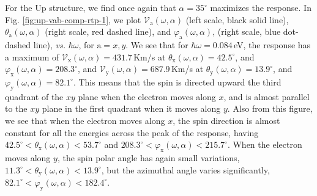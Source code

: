 \documentclass[floatfix,prb,aps,superscriptaddress,showpacs,11pt,preprint,letterpaper]{revtex4}
\begin{document}
For the Up structure, we find once again that  $\alpha=35^{\circ}$ maximizes
the response. In Fig. \ref{fig:up-vab-comp-rtp-1}, we plot
$\mathcal{V}_{\mathrm{a}} (\omega,\alpha)$ (left scale, black solid line),
$\theta_{\mathrm{a}} (\omega,\alpha)$ (right scale, red dashed  line), and
$\varphi_{\mathrm{a}} (\omega,\alpha)$, (right scale, blue dot-dashed  line), {\it vs.}
$\hbar\omega$, for $\mathrm{a}=x,y$. We see that for $\hbar\omega=0.084$\,eV,
the response has a maximum of $\mathcal{V}_{\mathrm{x}}
(\omega,\alpha)=431.7$\,Km/s at $\theta_{\mathrm{x}}(\omega,\alpha) =
42.5^{\circ}$, and $\varphi_{\mathrm{x}}(\omega,\alpha) = 208.3^{\circ}$, and
$\mathcal{V}_{\mathrm{y}} (\omega,\alpha)=687.9$\,Km/s at
$\theta_{\mathrm{y}}(\omega,\alpha) = 13.9^{\circ}$, and $\varphi_{\mathrm{y}}
(\omega,\alpha) = 82.1^{\circ}$. This means that the spin is directed upward
the third quadrant of the $xy$ plane when the electron moves along
$x$, and is almost parallel to the $xy$ plane in the first quadrant
when it moves along $y$. Also from this figure, we see that when the electron
moves along $x$, the spin direction is almost constant for all the energies
across the peak of the response, having $42.5^{\circ}<\theta_{\mathrm{x}}
(\omega,\alpha)<53.7^{\circ}$ and $208.3^{\circ}<\varphi_{\mathrm{x}}
(\omega,\alpha)<215.7^{\circ}$. When the electron moves along $y$, the spin
polar angle has again small variations, $11.3^{\circ}<
\theta_{\mathrm{y}}(\omega,\alpha)<13.9^{\circ}$, but the azimuthal angle
varies significantly, $82.1^{\circ}< \varphi_{\mathrm{y}}
(\omega,\alpha)<182.4^{\circ}$.
\end{document}
